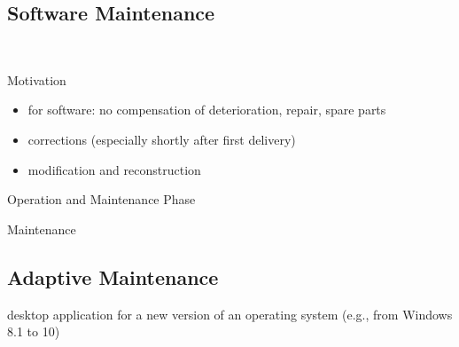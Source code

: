 \subsection{Software Maintenance}
\begin{frame}{\insertsubsection\ \mytitlesource{\ludewiglichter}} %
	\begin{fancycolumns}
		\begin{note}{Motivation}
			\begin{itemize}
				\item for software: no compensation of deterioration, repair, spare parts
				\item corrections (especially shortly after first delivery)
				\item modification and reconstruction
			\end{itemize}
		\end{note}
		\nextcolumn
		\begin{definition}{Operation and Maintenance Phase \mysource{\ieeesixten}}
		\end{definition}
		\begin{definition}{Maintenance \mysource{\ieeesixten}}
		\end{definition}
	\end{fancycolumns}
\end{frame}

\subsection{Adaptive Maintenance}
\begin{frame}{\insertsubsection}
	\begin{fancycolumns}
		\begin{definition}{\insertsubsection\mysource{\lientzswanson}}
			 \hfill \deutsch{adaptive Wartung}
		\end{definition}
		\begin{example}{}
			desktop application for a new version of an operating system (e.g., from Windows 8.1 to 10)
		\end{example}
		\nextcolumn
	\end{fancycolumns}
\end{frame}


